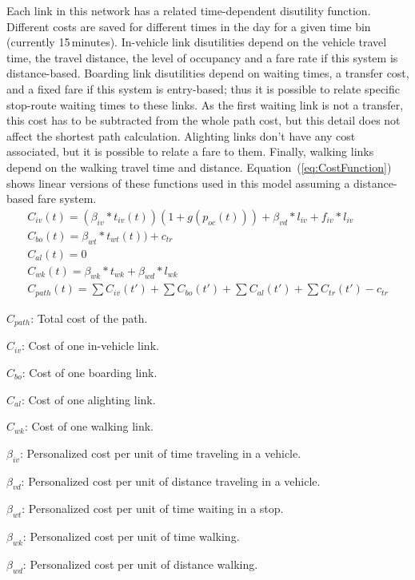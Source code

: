 Each link in this network has a related time-dependent disutility function. Different costs are saved for different times in the day for a given time bin (currently 15\,minutes). In-vehicle link disutilities depend on the vehicle travel time, the travel distance, the level of occupancy and a fare rate if this system is distance-based. Boarding link disutilities depend on waiting times, a transfer cost, and a fixed fare if this system is entry-based; thus it is possible to relate specific stop-route waiting times to these links. As the first waiting link is not a transfer, this cost has to be subtracted from the whole path cost, but this detail does not affect the shortest path calculation. Alighting links don't have any cost associated, but it is possible to relate a fare to them. Finally, walking links depend on the walking travel time and distance. Equation~(\ref{eq:CostFunction}) shows linear versions of these functions used in this model assuming a distance-based fare system.
%
\begin{equation}\label{eq:CostFunction}
	\begin{array}{l}
		C_{iv}(t) = (\beta_{iv}*t_{iv}(t))(1+g(p_{oc}(t))) + \beta_{vd}*l_{iv} + f_{iv}*l_{iv}\\
		C_{bo}(t) = \beta_{wt}*t_{wt}(t)) + c_{tr}\\
		C_{al}(t) = 0\\
		C_{wk}(t) = \beta_{wk}*t_{wk} + \beta_{wd}*l_{wk}\\
		C_{path}(t) = \sum{C_{iv}(t')} + \sum{C_{bo}(t')} + \sum{C_{al}(t')} + \sum{C_{tr}(t')} - c_{tr}
	\end{array}
\end{equation}

$C_{path}$: Total cost of the path.

$C_{iv}$: Cost of one in-vehicle link.

$C_{bo}$: Cost of one boarding link.

$C_{al}$: Cost of one alighting link.

$C_{wk}$: Cost of one walking link.

$\beta_{iv}$: Personalized cost per unit of time traveling in a vehicle.

$\beta_{vd}$: Personalized cost per unit of distance traveling in a vehicle.

$\beta_{wt}$: Personalized cost per unit of time waiting in a stop.

$\beta_{wk}$: Personalized cost per unit of time walking.

$\beta_{wd}$: Personalized cost per unit of distance walking.

